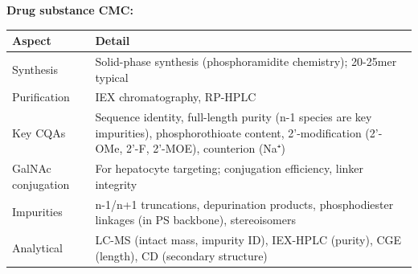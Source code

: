 \documentclass[
  11pt,
  a4paper,
]{report}
\begin{document}
\textbf{Drug substance CMC:}

\begin{longtable}[]{@{}ll@{}}
\toprule
\begin{minipage}[b]{0.47\columnwidth}\raggedright
Aspect\strut
\end{minipage} & \begin{minipage}[b]{0.47\columnwidth}\raggedright
Detail\strut
\end{minipage}\tabularnewline
\midrule
\endhead
\begin{minipage}[t]{0.47\columnwidth}\raggedright
Synthesis\strut
\end{minipage} & \begin{minipage}[t]{0.47\columnwidth}\raggedright
Solid-phase synthesis (phosphoramidite chemistry); 20-25mer
typical\strut
\end{minipage}\tabularnewline
\begin{minipage}[t]{0.47\columnwidth}\raggedright
Purification\strut
\end{minipage} & \begin{minipage}[t]{0.47\columnwidth}\raggedright
IEX chromatography, RP-HPLC\strut
\end{minipage}\tabularnewline
\begin{minipage}[t]{0.47\columnwidth}\raggedright
Key CQAs\strut
\end{minipage} & \begin{minipage}[t]{0.47\columnwidth}\raggedright
Sequence identity, full-length purity (n-1 species are key impurities),
phosphorothioate content, 2'-modification (2'-OMe, 2'-F, 2'-MOE),
counterion (Na⁺)\strut
\end{minipage}\tabularnewline
\begin{minipage}[t]{0.47\columnwidth}\raggedright
GalNAc conjugation\strut
\end{minipage} & \begin{minipage}[t]{0.47\columnwidth}\raggedright
For hepatocyte targeting; conjugation efficiency, linker integrity\strut
\end{minipage}\tabularnewline
\begin{minipage}[t]{0.47\columnwidth}\raggedright
Impurities\strut
\end{minipage} & \begin{minipage}[t]{0.47\columnwidth}\raggedright
n-1/n+1 truncations, depurination products, phosphodiester linkages (in
PS backbone), stereoisomers\strut
\end{minipage}\tabularnewline
\begin{minipage}[t]{0.47\columnwidth}\raggedright
Analytical\strut
\end{minipage} & \begin{minipage}[t]{0.47\columnwidth}\raggedright
LC-MS (intact mass, impurity ID), IEX-HPLC (purity), CGE (length), CD
(secondary structure)\strut
\end{minipage}\tabularnewline
\bottomrule
\end{longtable}
\end{document}
